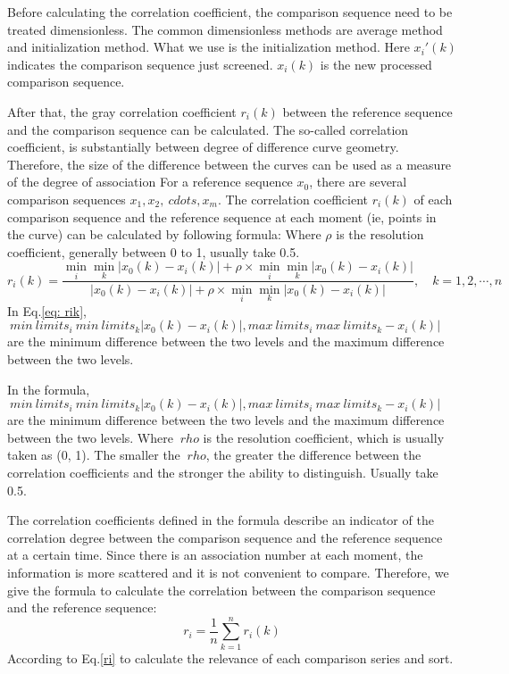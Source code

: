 \documentclass{mcmthesis}
\begin{document}
Before calculating the correlation coefficient, the comparison sequence need to be treated dimensionless. The common dimensionless methods are average method and initialization method.
What we use is the initialization method.
Here $ x_i '(k) $ indicates the comparison sequence just screened. $ x_i (k) $ is the new processed comparison sequence.

After that, the gray correlation coefficient $r_i(k)$ between the reference sequence and the comparison sequence can be calculated.
The so-called correlation coefficient, is substantially between degree of difference curve geometry. Therefore, the size of the difference between the curves can be used as a measure of the degree of association
For a reference sequence $ x_0 $, there are several comparison sequences $ x_1, x_2, \ cdots, x_m $. The correlation coefficient $ r_i (k) $ of each comparison sequence and the reference sequence at each moment (ie, points in the curve) can be calculated by following formula: Where $\rho$ is the resolution coefficient, generally between 0 to 1, usually take 0.5.
\begin{equation}
  r_i(k) = \frac{\min\limits_{i} \min\limits_{k}| x_0(k) - x_i(k)| + \rho \times \min\limits_{i} \min\limits_{k}| x_0(k) - x_i(k)|}{|x_0(k) - x_i(k)| + \rho \times \min\limits_{i} \min\limits_{k}| x_0(k) - x_i(k)|},\quad k=1,2,\cdots,n
  \label{eq: rik}
\end{equation}
In Eq.\ref{eq: rik}, $ \ min \ limits_ {i} \ min \ limits_ {k} | x_0 (k) - x_i (k) |, max \ limits_ {i} \ max \ limits_ {k} - x_i (k) | $ are the minimum difference between the two levels and the maximum difference between the two levels.

In the formula, $ \ min \ limits_ {i} \ min \ limits_ {k} | x_0 (k) - x_i (k) |, max \ limits_ {i} \ max \ limits_ {k} - x_i (k) | $ are the minimum difference between the two levels and the maximum difference between the two levels.
Where $ \ rho $ is the resolution coefficient, which is usually taken as (0, 1). The smaller the $ \ rho $, the greater the difference between the correlation coefficients and the stronger the ability to distinguish. Usually take 0.5.

The correlation coefficients defined in the formula describe an indicator of the correlation degree between the comparison sequence and the reference sequence at a certain time. Since there is an association number at each moment, the information is more scattered and it is not convenient to compare. Therefore, we give the formula to calculate the correlation between the comparison sequence and the reference sequence:
\begin{equation}
  r_i = \frac{1}{n}\sum\limits_{k=1}^{n}r_i(k) 
  \label{ri}
\end{equation}
According to Eq.\ref{ri} to calculate the relevance of each comparison series and sort.
\end{document}
